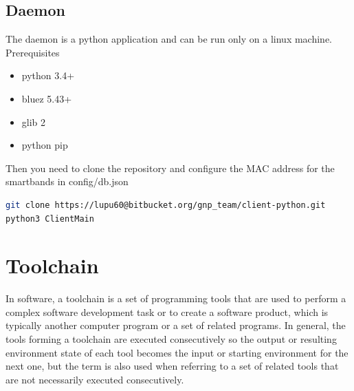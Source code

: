 \subsection{Daemon}
The daemon is a python application and can be run only on a linux machine.
Prerequisites
\begin{itemize}
	\item python 3.4+
    \item bluez 5.43+
	\item glib 2
	\item python pip
\end{itemize}
Then you need to clone the repository and configure the MAC address for the smartbands in config/db.json
\begin{lstlisting}[language=Bash]
git clone https://lupu60@bitbucket.org/gnp_team/client-python.git
python3 ClientMain
\end{lstlisting}


\section{Toolchain}
In software, a toolchain is a set of programming tools that are used to perform a complex software development task or to create a software product, which is typically another computer program or a set of related programs. In general, the tools forming a toolchain are executed consecutively so the output or resulting environment state of each tool becomes the input or starting environment for the next one, but the term is also used when referring to a set of related tools that are not necessarily executed consecutively.
\newline

